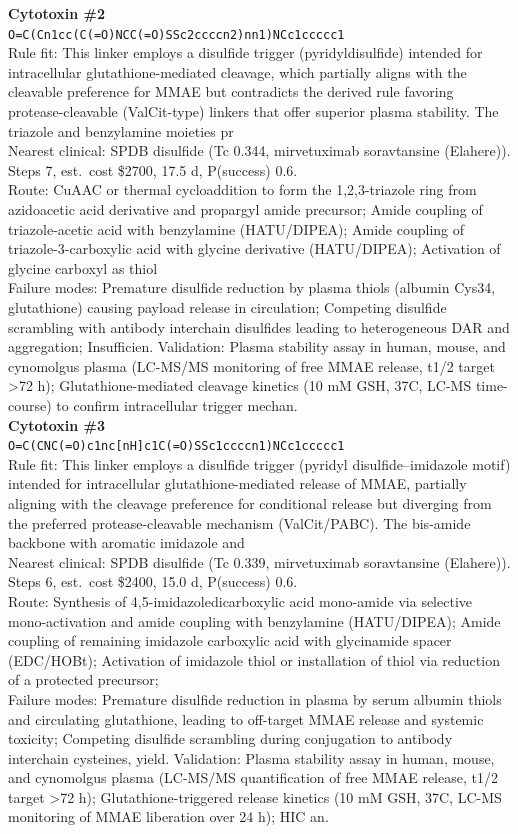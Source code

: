 \documentclass[10pt]{article}
\begin{document}
\noindent\textbf{Cytotoxin \#2} \\ \texttt{O=C(Cn1cc(C(=O)NCC(=O)SSc2ccccn2)nn1)NCc1ccccc1} \\ Rule fit: This linker employs a disulfide trigger (pyridyldisulfide) intended for intracellular glutathione-mediated cleavage, which partially aligns with the cleavable preference for MMAE but contradicts the derived rule favoring protease-cleavable (ValCit-type) linkers that offer superior plasma stability. The triazole and benzylamine moieties pr \\ Nearest clinical: SPDB disulfide (Tc 0.344, mirvetuximab soravtansine (Elahere)). Steps 7, est.\ cost \$2700, 17.5 d, P(success) 0.6. \\ Route: CuAAC or thermal cycloaddition to form the 1,2,3-triazole ring from azidoacetic acid derivative and propargyl amide precursor; Amide coupling of triazole-acetic acid with benzylamine (HATU/DIPEA); Amide coupling of triazole-3-carboxylic acid with glycine derivative (HATU/DIPEA); Activation of glycine carboxyl as thiol  \\ Failure modes: Premature disulfide reduction by plasma thiols (albumin Cys34, glutathione) causing payload release in circulation; Competing disulfide scrambling with antibody interchain disulfides leading to heterogeneous DAR and aggregation; Insufficien. Validation: Plasma stability assay in human, mouse, and cynomolgus plasma (LC-MS/MS monitoring of free MMAE release, t1/2 target >72 h); Glutathione-mediated cleavage kinetics (10 mM GSH, 37\textdegree{}C, LC-MS time-course) to confirm intracellular trigger mechan. \\[0.4em]
\noindent\textbf{Cytotoxin \#3} \\ \texttt{O=C(CNC(=O)c1nc[nH]c1C(=O)SSc1ccccn1)NCc1ccccc1} \\ Rule fit: This linker employs a disulfide trigger (pyridyl disulfide--imidazole motif) intended for intracellular glutathione-mediated release of MMAE, partially aligning with the cleavage preference for conditional release but diverging from the preferred protease-cleavable mechanism (ValCit/PABC). The bis-amide backbone with aromatic imidazole and \\ Nearest clinical: SPDB disulfide (Tc 0.339, mirvetuximab soravtansine (Elahere)). Steps 6, est.\ cost \$2400, 15.0 d, P(success) 0.6. \\ Route: Synthesis of 4,5-imidazoledicarboxylic acid mono-amide via selective mono-activation and amide coupling with benzylamine (HATU/DIPEA); Amide coupling of remaining imidazole carboxylic acid with glycinamide spacer (EDC/HOBt); Activation of imidazole thiol or installation of thiol via reduction of a protected precursor;  \\ Failure modes: Premature disulfide reduction in plasma by serum albumin thiols and circulating glutathione, leading to off-target MMAE release and systemic toxicity; Competing disulfide scrambling during conjugation to antibody interchain cysteines, yield. Validation: Plasma stability assay in human, mouse, and cynomolgus plasma (LC-MS/MS quantification of free MMAE release, t1/2 target >72 h); Glutathione-triggered release kinetics (10 mM GSH, 37\textdegree{}C, LC-MS monitoring of MMAE liberation over 24 h); HIC an. \\[0.4em]
\end{document}
